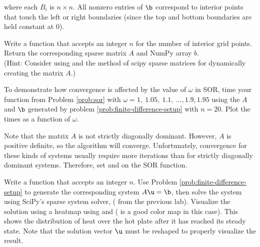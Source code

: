 where each $B_i$ is $n\times n$.
All nonzero entries of $\b$ correspond to interior points that touch the left or right boundaries (since the top and bottom boundaries are held constant at $0$).

\begin{problem}
Write a function that accepts an integer $n$ for the number of interior grid points.
Return the corresponding sparse matrix $A$ and NumPy array $b$.\\
(Hint: Consider using  and the  method of scipy sparse matrices for dynamically creating the matrix $A$.)
\label{prob:finite-difference-setup}
\end{problem}

\begin{problem}
To demonstrate how convergence is affected by the value of $\omega$ in SOR, time your function from Problem \ref{prob:sor} with $\omega = 1,\ 1.05,\ 1.1,\ \dots , 1.9, 1.95$ using the $A$ and $\b$ generated by problem \ref{prob:finite-difference-setup} with $n = 20$.
Plot the times as a function of $\omega$.

Note that the matrix $A$ is not strictly diagonally dominant.
However, $A$ is positive definite, so the algorithm will converge.
Unfortunately, convergence for these kinds of systems usually require more iterations than for strictly diagonally dominant systems.
Therefore, set  and  on the SOR function.
\end{problem}

\begin{problem}
Write a function that accepts an integer $n$.
Use Problem \ref{prob:finite-difference-setup} to generate the corresponding system $A\u = \b$, then solve the system using SciPy's sparse system solver,  ( from the previous lab).
Visualize the solution using a heatmap using  and 
( is a good color map in this case).
This shows the distribution of heat over the hot plate after it has reached its steady state.
Note that the solution vector $\u$ must be reshaped to properly visualize the result.
\end{problem}

